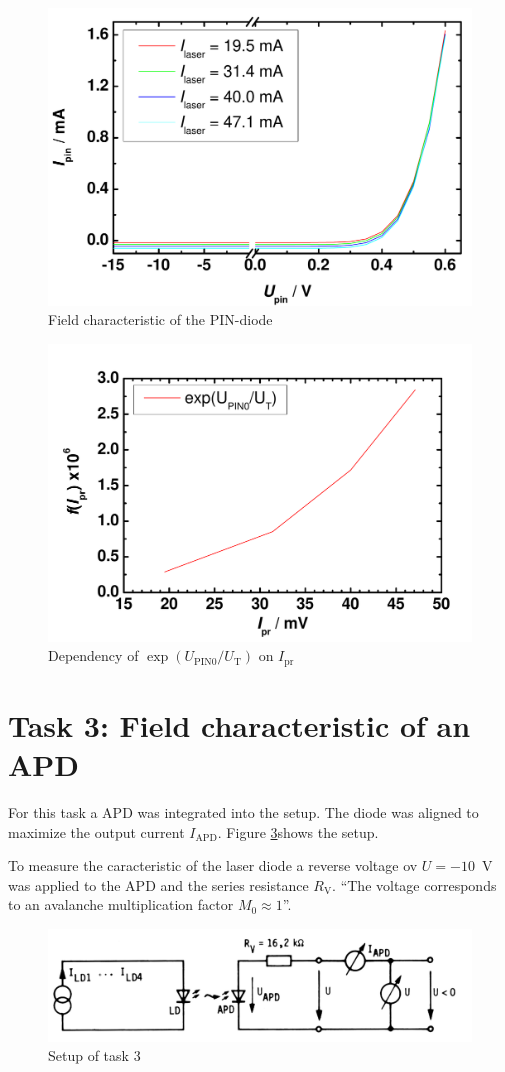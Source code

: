 \begin{figure}%
\centering
\includegraphics[width=.6\columnwidth]{Grafiken/PIN_kombiniert.pdf}%
\caption{Field characteristic of the PIN-diode}%
\label{fig:PIN_kombiniert}%
\end{figure}
\begin{figure}%
\centering
\includegraphics[width=.6\columnwidth]{Grafiken/UPIN0.pdf}%
\caption{Dependency of $\exp(U_{\mathrm{PIN0}}/U_{\mathrm{T}})$ on $I_{\mathrm{pr}}$}%
\label{fig:UPIN0}%
\end{figure}
\section{Task 3: Field characteristic of an APD}

For this task a APD was integrated into the setup. The diode was aligned to maximize the output current $I_{\mathrm{APD}}$.
Figure \ref{fig:T3_setup}\footnotemark[3] shows the setup.

To measure the caracteristic of the laser diode a reverse voltage ov $U = -10$~V was applied to the APD and the series resistance $R_{\mathrm{V}}$. ``The voltage corresponds to an avalanche multiplication factor $M_0 \approx 1$''\footnotemark[3].

\begin{figure}%
\centering
\includegraphics[width=.85\columnwidth]{Grafiken/T3_setup.jpg}%
\caption{Setup of task 3}%
\label{fig:T3_setup}%
\end{figure}


